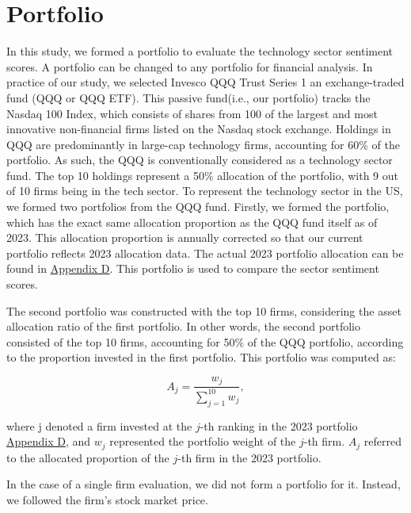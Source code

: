 \documentclass[logo,bsc,singlespacing,parskip]{infthesis}
\begin{document}
\section{Portfolio}
\label{portfolio}
In this study, we formed a portfolio to evaluate the technology sector sentiment scores. A portfolio can be changed to any portfolio for financial analysis. In practice of our study, we selected Invesco QQQ Trust Series 1 an exchange-traded fund (QQQ or QQQ ETF). This passive fund(i.e., our portfolio) tracks the Nasdaq 100 Index, which consists of shares from 100 of the largest and most innovative non-financial firms listed on the Nasdaq stock exchange. Holdings in QQQ are predominantly in large-cap technology firms, accounting for 60\% of the portfolio. As such, the QQQ is conventionally considered as a technology sector fund. The top 10 holdings represent a 50\% allocation of the portfolio, with 9 out of 10 firms being in the tech sector. To represent the technology sector in the US, we formed two portfolios from the QQQ fund. Firstly, we formed the portfolio, which has the exact same allocation proportion as the QQQ fund itself as of 2023. This allocation proportion is annually corrected so that our current portfolio reflects 2023 allocation data.  The actual 2023 portfolio allocation can be found in \hyperref[appendix_qqq]{Appendix D}. This portfolio is used to compare the sector sentiment scores.

The second portfolio was constructed with the top 10 firms, considering the asset allocation ratio of the first portfolio. In other words, the second portfolio consisted of the top 10 firms, accounting for 50\% of the QQQ portfolio, according to the proportion invested in the first portfolio. This portfolio was computed as:

\begin{equation} \label{5.3}
A_j = \frac{w_j}{\sum_{j=1}^{10} w_j}
,
\end{equation}


where j denoted a firm invested at the $j$-th ranking in the 2023 portfolio \hyperref[appendix_qqq]{Appendix D}, and $w_j$ represented the portfolio weight of the $j$-th firm. $A_j$ referred to the allocated proportion of the $j$-th firm in the 2023 portfolio. 

In the case of a single firm evaluation, we did not form a portfolio for it. Instead, we followed the firm’s stock market price.
\end{document}
